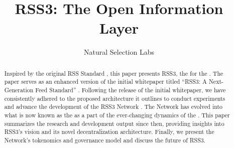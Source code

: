 \documentclass[final]{IEEEtran}
\begin{document}
\title{RSS3: The Open Information Layer}

\author{Natural Selection Labs}
\maketitle


\thispagestyle{plain}
\pagestyle{plain}

\begin{abstract}

    Inspired by the original RSS Standard \cite{rssadvisoryboard2009RSS}, this paper presents RSS3, the  for the . The paper serves as an enhanced version of the initial whitepaper titled ``RSS3: A Next-Generation Feed Standard'' \cite{whitepaper}. Following the release of the initial whitepaper, we have consistently adhered to the proposed architecture it outlines to conduct experiments and advance the development of the RSS3 Network \cite{dsl0.2,dsl0.3,dsl0.4}. The Network has evolved into what is now known as the  as a part of the ever-changing dynamics of the . This paper summarizes the research and development output since then, providing insights into RSS3's vision and its novel decentralization architecture. Finally, we present the Network's tokenomics and governance model and discuss the future of RSS3.

\end{abstract}
















\cleardoublepage

\printglossary[title=Glossary, toctitle=Glossary]
\end{document}

